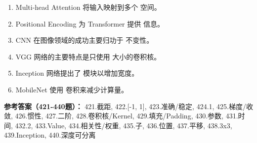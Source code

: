 \begin{enumerate}[resume,leftmargin=2em,itemsep=1pt]
\item Multi-head Attention 将输入映射到多个 \underline{\hspace{3em}} 空间。
\item Positional Encoding 为 Transformer 提供 \underline{\hspace{3em}} 信息。
\item CNN 在图像领域的成功主要归功于 \underline{\hspace{3em}} 不变性。
\item VGG 网络的主要特点是只使用 \underline{\hspace{3em}} 大小的卷积核。
\item Inception 网络提出了 \underline{\hspace{3em}} 模块以增加宽度。
\item MobileNet 使用 \underline{\hspace{3em}} 卷积来减少计算量。
\end{enumerate}

\textbf{参考答案（421-440题）：}
421.截距, 422.[-1, 1], 423.准确/稳定, 424.1, 425.梯度/收敛, 426.惯性, 427.二阶, 428.卷积核/Kernel, 429.填充/Padding, 430.参数, 431.时间, 432.2, 433.Value, 434.相关性/权重, 435.子, 436.位置, 437.平移, 438.3x3, 439.Inception, 440.深度可分离

